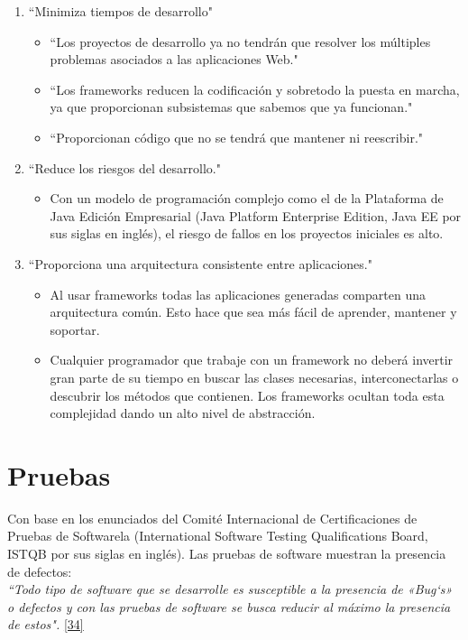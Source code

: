 \begin{enumerate}
	\item ``Minimiza tiempos de desarrollo"
	\begin{itemize}
	\item ``Los proyectos de desarrollo ya no tendrán que resolver los múltiples problemas asociados a las aplicaciones Web."
	\item ``Los frameworks reducen la codificación y sobretodo la puesta en marcha, ya que proporcionan subsistemas que sabemos que ya funcionan."
	\item ``Proporcionan código que no se tendrá que mantener ni reescribir."
	\end{itemize}
	\item ``Reduce los riesgos del desarrollo."
	\begin{itemize}
		\item Con un modelo de programación complejo como el de la Plataforma de Java Edición Empresarial (Java Platform Enterprise Edition, Java EE por sus siglas en inglés), el riesgo de fallos en los proyectos iniciales es alto.
	\end{itemize}
	\item ``Proporciona una arquitectura consistente entre aplicaciones."
	\begin{itemize}
		\item Al usar frameworks todas las aplicaciones generadas comparten una arquitectura común. Esto hace que sea más fácil de aprender, mantener y soportar.
		\item Cualquier programador que trabaje con un framework no deberá invertir gran parte de su tiempo en buscar las clases necesarias, interconectarlas o descubrir los métodos que contienen. Los frameworks ocultan toda esta complejidad dando un alto nivel de abstracción. 
	\end{itemize}
\end{enumerate}

\newpage

\section{Pruebas}

Con base en los enunciados del Comité Internacional de Certificaciones de Pruebas de Softwarela (International Software Testing Qualifications Board, ISTQB por sus siglas en inglés). Las pruebas de software muestran la presencia de defectos:\\

 \textit {``Todo tipo de software que se desarrolle es susceptible a la presencia de «Bug`s» o defectos y con las pruebas de software se busca reducir al máximo la presencia de estos".} \hyperlink{b34}{[34]} \\


